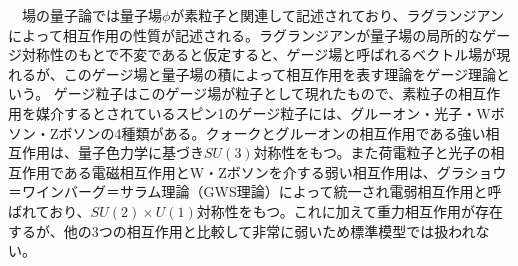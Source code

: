 　場の量子論では量子場$\phi$が素粒子と関連して記述されており、ラグランジアンによって相互作用の性質が記述される。ラグランジアンが量子場の局所的なゲージ対称性のもとで不変であると仮定すると、ゲージ場と呼ばれるベクトル場が現れるが、このゲージ場と量子場の積によって相互作用を表す理論をゲージ理論という。
ゲージ粒子はこのゲージ場が粒子として現れたもので、素粒子の相互作用を媒介するとされているスピン1のゲージ粒子には、グルーオン・光子・Wボソン・Zボソンの4種類がある。クォークとグルーオンの相互作用である強い相互作用は、量子色力学に基づき$SU(3)$対称性をもつ。また荷電粒子と光子の相互作用である電磁相互作用とW・Zボソンを介する弱い相互作用は、グラショウ＝ワインバーグ＝サラム理論（GWS理論）によって統一され電弱相互作用と呼ばれており、$SU(2)\times U(1)$対称性をもつ。これに加えて重力相互作用が存在するが、他の3つの相互作用と比較して非常に弱いため標準模型では扱われない。\\
